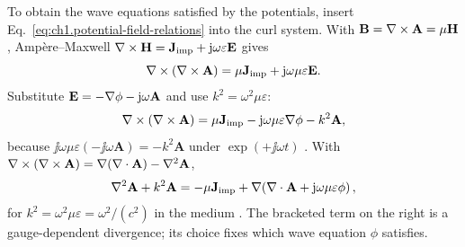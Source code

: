 To obtain the wave equations satisfied by the potentials, insert Eq.~\eqref{eq:ch1.potential-field-relations} into the curl system. With $\mathbf{B}=\nabla\times\mathbf{A}=\mu\mathbf{H}$, Amp\`ere--Maxwell $\nabla\times\mathbf{H}=\mathbf{J}_{\mathrm{imp}}+\mathrm{j}\omega\varepsilon\mathbf{E}$ gives
\begin{equation}
\label{eq:ch1.ampere-for-potentials}
\nabla\times(\nabla\times\mathbf{A})
=\mu\mathbf{J}_{\mathrm{imp}}+\mathrm{j}\omega\mu\varepsilon\mathbf{E}.
\end{equation}
Substitute $\mathbf{E}=-\nabla\phi-\mathrm{j}\omega\mathbf{A}$ and use $k^2=\omega^2\mu\varepsilon$:
\begin{equation}
\label{eq:ch1.ampere-for-potentials-substituted}
\nabla\times(\nabla\times\mathbf{A})
=\mu\mathbf{J}_{\mathrm{imp}}-\mathrm{j}\omega\mu\varepsilon\nabla\phi-k^2\mathbf{A},
\end{equation}
because $\jj\omega\mu\varepsilon(-\jj\omega\mathbf{A})=-k^2\mathbf{A}$ under $\exp(+\jj\omega t)$ \cite{stratton1941,jackson1999}. With $\nabla\times(\nabla\times\mathbf{A})=\nabla(\nabla\cdot\mathbf{A})-\nabla^2\mathbf{A}$,
\begin{equation}
\label{eq:ch1.A-general-gauge-wave}
\nabla^2\mathbf{A}+k^2\mathbf{A}
=-\mu\mathbf{J}_{\mathrm{imp}}+\nabla\!\left(\nabla\cdot\mathbf{A}+\mathrm{j}\omega\mu\varepsilon\phi\right),
\end{equation}
for $k^2=\omega^2\mu\varepsilon=\omega^2/(c^2)$ in the medium \cite{stratton1941,jackson1999}. The bracketed term on the right is a gauge-dependent divergence; its choice fixes which wave equation $\phi$ satisfies.

